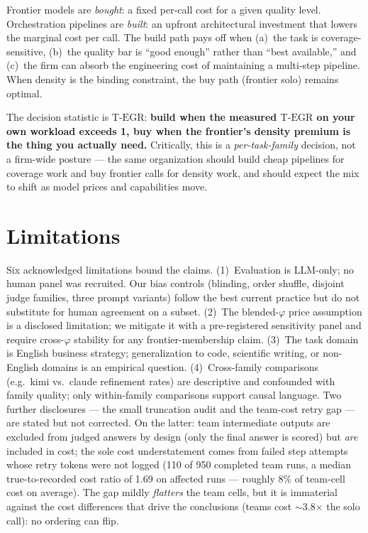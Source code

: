\documentclass[12pt,a4paper]{article}
\newcommand{\phiBlend}{\varphi}
\newcommand{\TEGR}{\ensuremath{\text{T-EGR}}}
\begin{document}
Frontier models are \emph{bought}: a fixed per-call cost for a given quality
level. Orchestration pipelines are \emph{built}: an upfront architectural
investment that lowers the marginal cost per call. The build path pays off when
(a)~the task is coverage-sensitive, (b)~the quality bar is ``good enough'' rather
than ``best available,'' and (c)~the firm can absorb the engineering cost of
maintaining a multi-step pipeline. When density is the binding constraint, the buy
path (frontier solo) remains optimal.

The decision statistic is $\TEGR$: \textbf{build when the measured $\TEGR$ on your
own workload exceeds 1, buy when the frontier's density premium is the thing you
actually need.} Critically, this is a \emph{per-task-family} decision, not a
firm-wide posture --- the same organization should build cheap pipelines for
coverage work and buy frontier calls for density work, and should expect the mix
to shift as model prices and capabilities move.

\section{Limitations}\label{sec:limitations}

Six acknowledged limitations bound the claims. (1)~Evaluation is LLM-only; no
human panel was recruited. Our bias controls (blinding, order shuffle, disjoint
judge families, three prompt variants) follow the best current practice
\citep{ZhengEtAl2023, VergaEtAl2024} but do not substitute for human agreement
on a subset. (2)~The blended-$\phiBlend$ price assumption is a disclosed
limitation; we mitigate it with a pre-registered sensitivity panel and require
cross-$\phiBlend$ stability for any frontier-membership claim. (3)~The task
domain is English business strategy; generalization to code, scientific writing,
or non-English domains is an empirical question. (4)~Cross-family comparisons
(e.g.\ kimi vs.\ claude refinement rates) are descriptive and confounded with
family quality; only within-family comparisons support causal language. Two
further disclosures --- the small truncation audit and the team-cost retry gap
--- are stated but not corrected. On the latter: team intermediate outputs are
excluded from judged answers by design (only the final answer is scored) but
\emph{are} included in cost; the sole cost understatement comes from failed
step attempts whose retry tokens were not logged (110 of 950 completed team
runs, a median true-to-recorded cost ratio of 1.69 on affected runs ---
roughly 8\% of team-cell cost on average). The gap mildly \emph{flatters} the
team cells, but it is immaterial against the cost differences that drive the
conclusions (teams cost $\sim$3.8$\times$ the solo call): no ordering can
flip.
\end{document}

